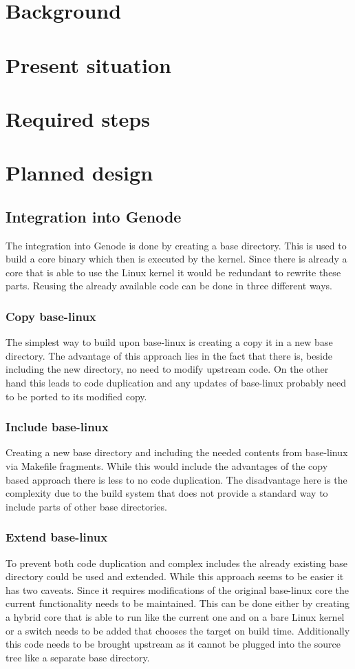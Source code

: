 \documentclass[
a4paper,
12pt,
notitlepage,
parskip=half,
DIV=11,
]{scrbook}
\begin{document}
	
	\chapter{Background}
	\chapter{Present situation} %
	\chapter{Required steps} %
	\chapter{Planned design}
		\section{Integration into Genode}
		The integration into Genode is done by creating a base directory.
		This is used to build a core binary which then is executed by the kernel.
		Since there is already a core that is able to use the Linux kernel it would be redundant to rewrite these parts.
		Reusing the already available code can be done in three different ways.
		\subsection{Copy base-linux}
		The simplest way to build upon base-linux is creating a copy it in a new base directory.
		The advantage of this approach lies in the fact that there is, beside including the new directory, no need to modify upstream code.
		On the other hand this leads to code duplication and any updates of base-linux probably need to be ported to its modified copy.
		\subsection{Include base-linux}
		Creating a new base directory and including the needed contents from base-linux via Makefile fragments.
		While this would include the advantages of the copy based approach there is less to no code duplication.
		The disadvantage here is the complexity due to the build system that does not provide a standard way to include parts of other base directories.
		\subsection{Extend base-linux}
		To prevent both code duplication and complex includes the already existing base directory could be used and extended.
		While this approach seems to be easier it has two caveats.
		Since it requires modifications of the original base-linux core the current functionality needs to be maintained.
		This can be done either by creating a hybrid core that is able to run like the current one and on a bare Linux kernel or a switch needs to be added that chooses the target on build time.
		Additionally this code needs to be brought upstream as it cannot be plugged into the source tree like a separate base directory.
\end{document}
